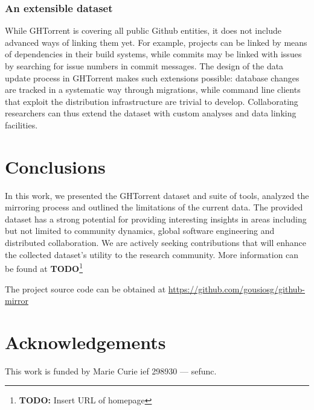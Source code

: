 \documentclass[conference]{IEEEtran}
\newcommand{\todo}[1]{\textbf{TODO}\footnote{\textbf{TODO:} #1}}
\begin{document}
\subsubsection{An extensible dataset} While GHTorrent is covering all 
 public Github entities, it does not include advanced ways of
linking them yet. For example, projects can be linked by means of dependencies
in their build systems, while commits may be linked with issues by
searching for issue numbers in commit messages. The design of the
data update process in GHTorrent makes such extensions possible:
database changes are tracked in a systematic way through migrations, while  
command line clients that exploit the distribution infrastructure are
trivial to develop. Collaborating researchers can thus extend the dataset
with custom analyses and data linking facilities.

\section{Conclusions}

In this work, we presented the GHTorrent dataset and suite of tools, analyzed
the mirroring process and outlined the limitations of the current data.  The
provided dataset has a strong potential for providing interesting insights in
areas including but not limited to community dynamics, global software
engineering and distributed collaboration. We are actively seeking contributions
that will enhance the collected dataset's utility to the research community. 
More information can be found at \todo{Insert URL of homepage}

The project source code can be obtained at \url{https://github.com/gousiosg/github-mirror}

\section*{Acknowledgements}
This work is funded by Marie Curie {\sc ief} 298930 --- {\sc sefunc}.



\end{document}
